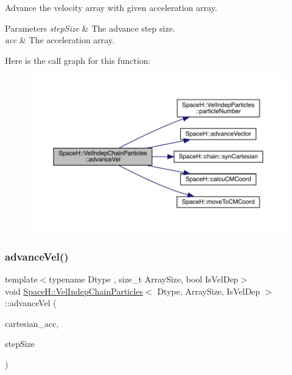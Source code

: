 Advance the velocity array with given acceleration array. 


\begin{DoxyParams}{Parameters}
{\em step\+Size} & The advance step size. \\
\hline
{\em acc} & The acceleration array. \\
\hline
\end{DoxyParams}
Here is the call graph for this function\+:
\nopagebreak
\begin{figure}[H]
\begin{center}
\leavevmode
\includegraphics[width=350pt]{class_space_h_1_1_vel_indep_chain_particles_a628718ae8e943e403adc9864be81d306_cgraph}
\end{center}
\end{figure}
\mbox{\label{class_space_h_1_1_vel_indep_chain_particles_ae5253fbb69161c625f878de540618eb7}} 
\subsubsection{\texorpdfstring{advance\+Vel()}{advanceVel()}\hspace{0.1cm}{\footnotesize\ttfamily [2/2]}}
{\footnotesize\ttfamily template$<$typename Dtype , size\+\_\+t Array\+Size, bool Is\+Vel\+Dep$>$ \\
void \mbox{\hyperlink{class_space_h_1_1_vel_indep_chain_particles}{Space\+H\+::\+Vel\+Indep\+Chain\+Particles}}$<$ Dtype, Array\+Size, Is\+Vel\+Dep $>$\+::advance\+Vel (\begin{DoxyParamCaption}\item[{const \mbox{\hyperlink{class_space_h_1_1_vel_indep_particles_aa9983058940249df8b00fa800e8cbad2}{Vector\+Array}} \&}]{cartesian\+\_\+acc,  }\item[{\mbox{\hyperlink{class_space_h_1_1_vel_indep_particles_aeb47d8131b30ed790320ff634f0d6af1}{Scalar}}}]{step\+Size }\end{DoxyParamCaption})\hspace{0.3cm}{\ttfamily [inline]}}



